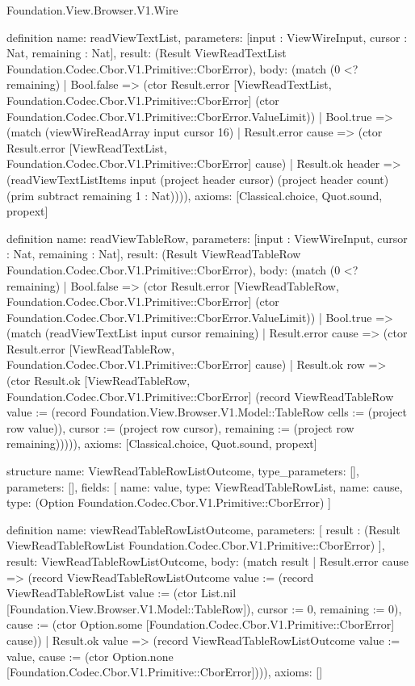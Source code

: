 \begin{lexlean}{Foundation.View.Browser.V1.Wire}
\begin{semanticmodule}
definition{
  name: readViewTextList,
  parameters: [input : ViewWireInput, cursor : Nat, remaining : Nat],
  result: (Result ViewReadTextList Foundation.Codec.Cbor.V1.Primitive::CborError),
  body: (match (0 <? remaining)
    | Bool.false => (ctor Result.error [ViewReadTextList, Foundation.Codec.Cbor.V1.Primitive::CborError] (ctor Foundation.Codec.Cbor.V1.Primitive::CborError.ValueLimit))
    | Bool.true => (match (viewWireReadArray input cursor 16)
      | Result.error cause => (ctor Result.error [ViewReadTextList, Foundation.Codec.Cbor.V1.Primitive::CborError] cause)
      | Result.ok header => (readViewTextListItems input (project header cursor) (project header count) (prim subtract remaining 1 : Nat)))),
  axioms: [Classical.choice, Quot.sound, propext]
}

definition{
  name: readViewTableRow,
  parameters: [input : ViewWireInput, cursor : Nat, remaining : Nat],
  result: (Result ViewReadTableRow Foundation.Codec.Cbor.V1.Primitive::CborError),
  body: (match (0 <? remaining)
    | Bool.false => (ctor Result.error [ViewReadTableRow, Foundation.Codec.Cbor.V1.Primitive::CborError] (ctor Foundation.Codec.Cbor.V1.Primitive::CborError.ValueLimit))
    | Bool.true => (match (readViewTextList input cursor remaining)
      | Result.error cause => (ctor Result.error [ViewReadTableRow, Foundation.Codec.Cbor.V1.Primitive::CborError] cause)
      | Result.ok row => (ctor Result.ok [ViewReadTableRow, Foundation.Codec.Cbor.V1.Primitive::CborError] (record ViewReadTableRow {value := (record Foundation.View.Browser.V1.Model::TableRow {cells := (project row value)}), cursor := (project row cursor), remaining := (project row remaining)})))),
  axioms: [Classical.choice, Quot.sound, propext]
}

structure{
  name: ViewReadTableRowListOutcome,
  type_parameters: [],
  parameters: [],
  fields: [
    {name: value, type: ViewReadTableRowList},
    {name: cause, type: (Option Foundation.Codec.Cbor.V1.Primitive::CborError)}
  ]
}

definition{
  name: viewReadTableRowListOutcome,
  parameters: [
    result : (Result ViewReadTableRowList Foundation.Codec.Cbor.V1.Primitive::CborError)
  ],
  result: ViewReadTableRowListOutcome,
  body: (match result
    | Result.error cause => (record ViewReadTableRowListOutcome {value := (record ViewReadTableRowList {value := (ctor List.nil [Foundation.View.Browser.V1.Model::TableRow]), cursor := 0, remaining := 0}), cause := (ctor Option.some [Foundation.Codec.Cbor.V1.Primitive::CborError] cause)})
    | Result.ok value => (record ViewReadTableRowListOutcome {value := value, cause := (ctor Option.none [Foundation.Codec.Cbor.V1.Primitive::CborError])})),
  axioms: []
}


\end{semanticmodule}
\end{lexlean}
